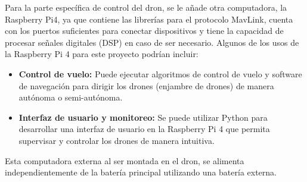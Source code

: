 \noindent Para la parte específica de control del dron, se le añade otra computadora, la Raspberry Pi4, ya que contiene las librerías para el protocolo MavLink, cuenta con los puertos suficientes para conectar dispositivos y tiene la capacidad de procesar señales digitales (DSP) en caso de ser necesario. Algunos de los usos de la Raspberry Pi 4 para este proyecto podrían incluir:
\begin{itemize}
    \item \textbf{Control de vuelo:} Puede ejecutar algoritmos de control de vuelo y software de navegación para dirigir los drones (enjambre de drones) de manera autónoma o semi-autónoma.
    \item \textbf{Interfaz de usuario y monitoreo:} Se puede utilizar Python para desarrollar una interfaz de usuario en la Raspberry Pi 4 que permita supervisar y controlar los drones de manera intuitiva.
\end{itemize}
Esta computadora externa al ser montada en el dron, se alimenta independientemente de la batería principal utilizando una batería externa.
